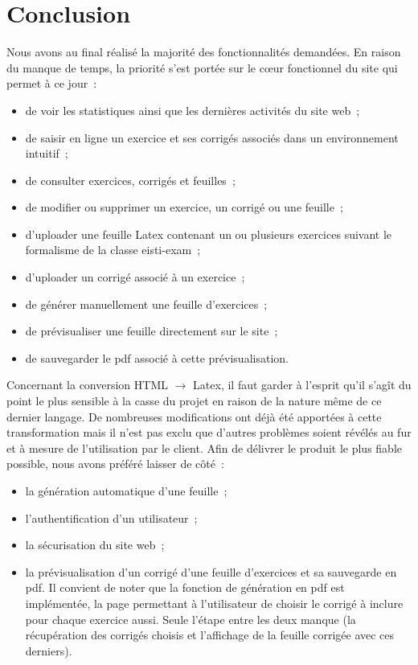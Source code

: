 \newpage
\section{Conclusion}

Nous avons au final réalisé la majorité des fonctionnalités demandées. En raison du manque de temps, la priorité s'est portée sur le cœur fonctionnel du site qui permet à ce jour~:

\smallskip
\begin{itemize}
\item de voir les statistiques ainsi que les dernières activités du site web~;
\item de saisir en ligne un exercice et ses corrigés associés dans un environnement intuitif~;
\item de consulter exercices, corrigés et feuilles~;
\item de modifier ou supprimer un exercice, un corrigé ou une feuille~;
\item d'uploader une feuille Latex contenant un ou plusieurs exercices suivant le formalisme de la classe eisti-exam~;
\item d'uploader un corrigé associé à un exercice~;
\item de générer manuellement une feuille d'exercices~;
\item de prévisualiser une feuille directement sur le site~;
\item de sauvegarder le pdf associé à cette prévisualisation.
\end{itemize}

\medskip 
Concernant la conversion HTML $\rightarrow$ Latex, il faut garder à l'esprit qu'il s'agît du point le plus sensible à la casse du projet en raison de la nature même de ce dernier langage. De nombreuses modifications ont déjà été apportées à cette transformation mais il n'est pas exclu que d'autres problèmes soient révélés au fur et à mesure de l'utilisation par le client. Afin de délivrer le produit le plus fiable possible, nous avons préféré laisser de côté~:

\smallskip
\begin{itemize}
\item la génération automatique d'une feuille~;
\item l'authentification d'un utilisateur~;
\item la sécurisation du site web~;
\item la prévisualisation d'un corrigé d'une feuille d'exercices et sa sauvegarde en pdf. Il convient de noter que la fonction de génération en pdf est implémentée, la page permettant à l'utilisateur de choisir le corrigé à inclure pour chaque exercice aussi. Seule l'étape entre les deux manque (la récupération des corrigés choisis et l'affichage de la feuille corrigée avec ces derniers).
\end{itemize}

